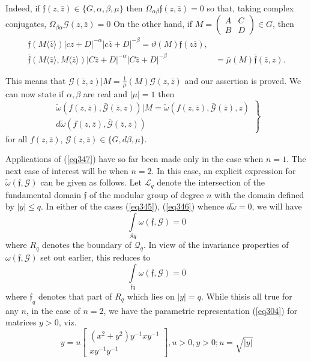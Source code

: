  Indeed, if $\mathfrak{f}(z, \bar{z}) \in \{ G, \alpha, \beta, \mu \}$
 then $\Omega_{\alpha \beta } \mathfrak{f}(z, \bar{z})=0$ so that,
 taking complex conjugates, $\Omega_{\beta \alpha } \mathcal{G} (z,
 \bar{z}) = 0 $ On the other hand, if $M = \begin{pmatrix} A & C\\ B &
   D \end {pmatrix} \in G$, then  
\begin{align*}
 \mathfrak{f} (M \langle \bar{z} \rangle) |cz + D |^{-\alpha} |c
 \bar{z} + D |^{-\beta} = \vartheta (M) \mathfrak{f} (z \bar{z}),\\ 
 \bar{\mathfrak{f}} (M \langle \bar{z} \rangle, M \langle \bar{z}
 \rangle) |C \bar{z} + D|^{- \alpha} |C \bar{z} + D|^{- \beta }&  =
 \bar{\mu }  (M) \bar{\mathfrak{f}} (\bar{z}, z). 
\end{align*}\pageoriginale
 
 This means that $\mathcal{G} (\bar{z}, z) |M = \frac{1}{\mu} (M)
 \mathcal {G} (z, \bar{z} )$ and our assertion is proved. We can now
 state if $\alpha, \beta $ are real and  $|\mu | = 1 $ then  
 \begin{equation*}
\left.
\begin{aligned}
\tilde{\omega} (f (z, \bar{z}), \bar{\mathcal{G}}(\bar{z}, z )) | M =
\tilde{\omega} (f (z, \bar{z}),  
\bar{\mathcal{G}}(\bar{z}), z)\\
d \tilde{\omega} (f (z, \bar{z}), \bar{\mathcal{G}}( \bar{z}, z))
\end{aligned}
\right \} \tag{347}\label{eq347}  
 \end{equation*} 
 for all $f (z,  \bar{z})$, $\mathcal{G}(z, \bar{z}) \in \{G, d \beta,
 \mu \}$. 
 
 Applications of (\ref{eq347}) have so far been made only in the case when
 $n = 1$. The next case of interest will be when $n = 2$. In this
 case, an explicit expression for $\tilde{\omega}(\mathfrak{f},
 \mathcal{G})$ can be given as follows. Let $\mathscr{L}_q$ denote the
 intersection of the fundamental domain $\mathfrak{f}$ of the modular
 group of degree $n$ with the domain defined by $|y| \leq q$.  
In either of the cases (\ref{eq345}), (\ref{eq346}) whence
$d\tilde{\omega} =0$, we will have
 $$
 \int\limits_{\mathfrak{K} q} \omega (\mathfrak{f}, \mathcal{G}) = 0
 $$
 where $R_q$ denotes the boundary of $\mathscr{Q}_q$. In view of the
 invariance properties of $\omega (\mathfrak{f}, \mathcal{G})$ set out
 earlier, this reduces to  
 \begin{equation*}
 \int\limits_{\mathfrak{f} q} \omega (\mathfrak{f}, \mathcal{G}) = 0
 \tag{348}\label{eq348}   
 \end{equation*}
 where $\mathfrak{f}_q$ denotes that part of $R_q$ which lies on $|y| =
 q$. While this\pageoriginale is all true for any $n$, in the case of
 $n = 2$, we  have the parametric representation (\ref{eq304}) for
 matrices $y > 0$, viz.  
$$
y = u \begin{bmatrix} (x^2 +  y^2) y^{-1}   x y^{-1} \\  xy^{-1}
  y^{-1} \end{bmatrix} , u > 0, y > 0 ; u = \sqrt{|y|} 
$$

